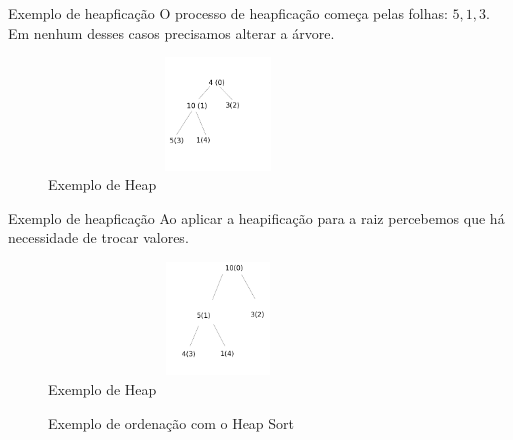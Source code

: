 \begin{frame}
	\begin{block}{Exemplo de heapficação}
		O processo de heapficação começa pelas folhas: $5,1,3$. 
		Em nenhum desses casos precisamos alterar a árvore.
		\begin{figure}[!htb]
			\centering	  				
			\includegraphics[height=3cm, width = 9cm]{./pic/g127-9.png}
			\caption{Exemplo de Heap \cite{GEEKS_2018}}
		\end{figure}
	\end{block}
\end{frame}


\begin{frame}
	\begin{block}{Exemplo de heapficação}
		Ao aplicar a heapificação para a raiz percebemos que há necessidade de trocar valores.
		\begin{figure}[!htb]
			\centering	  				
			\includegraphics[height=3cm, width = 9cm]{./pic/g2755.png}
			\caption{Exemplo de Heap \cite{GEEKS_2018}}
		\end{figure}
	\end{block}
\end{frame}


\begin{frame}{}
	\begin{figure}[h!]
		\centering    
		  \caption{Exemplo de ordenação com o Heap Sort \cite{GEEKS_2018}}
	 \end{figure} 
\end{frame}


